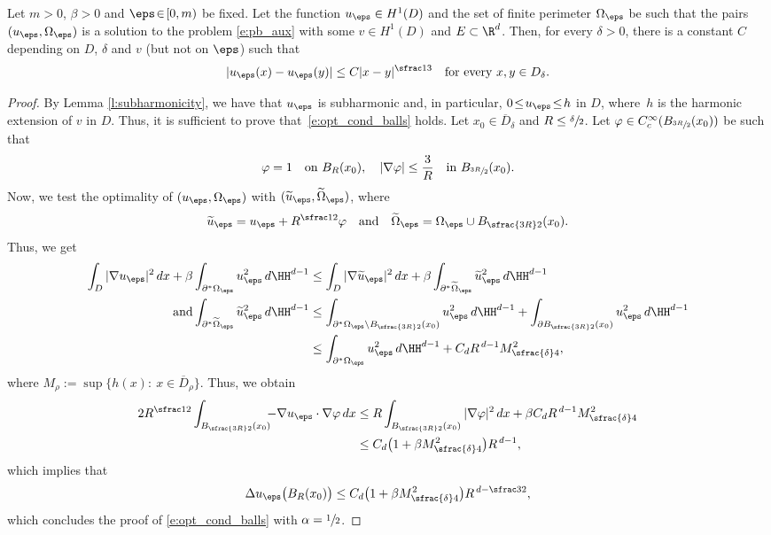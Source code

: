 \begin{prop}\label{p:holder}
Let $m\!>\!0$, $\beta\!>\!0$ and $\eps\!\in\![0,m)$ be fixed. Let the function $u_\eps\in H^1(D)$ and the set of finite perimeter $\Omega_\eps$ be such that the pairs $(u_\eps,\Omega_\eps)$ is a solution to the problem \eqref{e:pb_aux} with some $v\in H^1(D)$ and $E\subset \R^d$. Then, for every $\delta>0$, there is a constant $C$ depending on $D$, $\delta$ and $v$ (but not on $\eps$) such that
\[|u_\eps(x)-u_\eps(y)|\le C|x-y|^{\sfrac13}\quad\text{for every } x,y\in D_\delta.\]
\end{prop}
\begin{proof}
By Lemma \ref{l:subharmonicity}, we have that $u_\eps$ is subharmonic and, in particular, $0\!\le\!u_\eps\!\le\!h$ in $D$, where~$h$ is the harmonic extension of $v$ in $D$. Thus, it is sufficient to prove that~\eqref{e:opt_cond_balls} holds. Let $x_0\in \overline D_\delta$ and $R\le \sfrac\delta2$. Let $\varphi\in C^\infty_c(B_{\sfrac{3R}2}(x_0))$ be such that
\[\varphi=1\quad\text{on } B_R(x_0),\quad |\nabla \varphi|\le \frac{3}{R}\quad\text{in } B_{\sfrac{3R}2}(x_0).\]
Now, we test the optimality of $(u_\eps,\Omega_\eps)$ with $(\widetilde u_\eps,\widetilde \Omega_\eps)$, where
\[\widetilde u_\eps=u_\eps+R^{\sfrac12}\varphi\quad\text{and}\quad \widetilde \Omega_\eps=\Omega_\eps\cup B_{\sfrac{3R}2}(x_0).\]
Thus, we get
\begin{align*}
\int_{D}|\nabla u_\eps|^2\,dx+\beta\int_{\partial^\ast\Omega_\eps}u_\eps^2\,d\HH^{d-1}&\le \int_{D}|\nabla \widetilde u_\eps|^2\,dx+\beta\int_{\partial^\ast\widetilde \Omega_\eps}\widetilde u_\eps^2\,d\HH^{d-1}\\
\tag*{and}
\int_{\partial^\ast\widetilde \Omega_\eps}\widetilde u_\eps^2\,d\HH^{d-1}&\le \int_{\partial^\ast \Omega_\eps\setminus B_{\sfrac{3R}2}(x_0)} u_\eps^2\,d\HH^{d-1}+\int_{\partial B_{\sfrac{3R}2}(x_0)} u_\eps^2\,d\HH^{d-1}\\
&\le \int_{\partial^\ast\Omega_\eps}u_\eps^2\,d\HH^{d-1}+C_d R^{\,d-1}M_{\sfrac{\delta}4}^2,
\end{align*}
where $M_\rho:=\sup\big\{h(x):\ x\in \overline D_\rho\big\}.$
Thus, we obtain
\begin{align*}
2R^{\sfrac12}\int_{B_{\sfrac{3R}2}(x_0)}\!\!\!-\nabla u_\eps\cdot\nabla \varphi\,dx&\le R\int_{B_{\sfrac{3R}2}(x_0)}|\nabla \varphi|^2\,dx+\beta C_dR^{\,d-1}M_{\sfrac{\delta}4}^2\\
&\le C_d\big(1+\beta M_{\sfrac{\delta}4}^2\big)R^{\,d-1},
\end{align*}
which implies that
\[\Delta u_\eps\big(B_R(x_0)\big)\le C_d\big(1+\beta M_{\sfrac{\delta}4}^2\big)R^{\,d-\sfrac32},\]
which concludes the proof of \eqref{e:opt_cond_balls} with $\alpha=\sfrac12$.
\end{proof}

